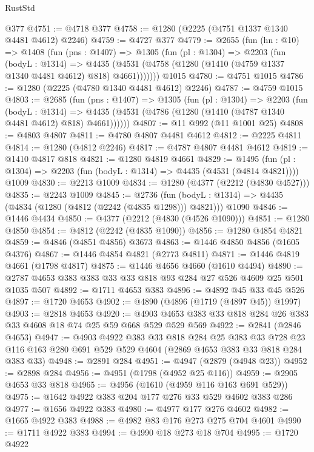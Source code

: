 \begin{lexlean}{RustStd}
\begin{coremodule}
    @377
@4751 := @4718 @377
@4758 := @1280 (@2225 (@4751 @1337 @1340 @4481 @4612) @2246)
@4759 := @4727 @377
@4779 := @2655
    (fun (hn : @10) =>
    @1408
      (fun (pns : @1407) =>
      @1305
        (fun (pl : @1304) =>
        @2203
          (fun (bodyL : @1314) =>
          @4435 (@4531 (@4758 (@1280 (@1410 (@4759 @1337 @1340 @4481 @4612) @818) @4661)))))))
    @1015
@4780 := @4751 @1015
@4786 := @1280 (@2225 (@4780 @1340 @4481 @4612) @2246)
@4787 := @4759 @1015
@4803 := @2685
    (fun (pns : @1407) =>
    @1305
      (fun (pl : @1304) =>
      @2203
        (fun (bodyL : @1314) =>
        @4435 (@4531 (@4786 (@1280 (@1410 (@4787 @1340 @4481 @4612) @818) @4661))))))
@4807 := @11 @992 (@11 @1001 @25)
@4808 := @4803 @4807
@4811 := @4780 @4807 @4481 @4612
@4812 := @2225 @4811
@4814 := @1280 (@4812 @2246)
@4817 := @4787 @4807 @4481 @4612
@4819 := @1410 @4817 @818
@4821 := @1280 @4819 @4661
@4829 := @1495
    (fun (pl : @1304) => @2203 (fun (bodyL : @1314) => @4435 (@4531 (@4814 @4821))))
    @1009
@4830 := @2213 @1009
@4834 := @1280 (@4377 (@2212 (@4830 @4527)))
@4835 := @2243 @1009
@4845 := @2736
    (fun (bodyL : @1314) => @4435 (@4834 (@1280 (@4812 (@2242 (@4835 @1298))) @4821)))
    @1090
@4846 := @1446 @4434
@4850 := @4377 (@2212 (@4830 (@4526 @1090)))
@4851 := @1280 @4850
@4854 := @4812 (@2242 (@4835 @1090))
@4856 := @1280 @4854 @4821
@4859 := @4846 (@4851 @4856) @3673
@4863 := @1446 @4850 @4856 (@1605 @4376)
@4867 := @1446 @4854 @4821 (@2773 @4811)
@4871 := @1446 @4819 @4661 (@1798 @4817)
@4875 := @1446 @4656 @4660 (@1610 @4494)
@4890 := @2787 @4653 @383 @383 @33 @33 @818 @93 @284 @27 @526 @4609 @25 @501 @1035 @507
@4892 := @1711 @4653 @383
@4896 := @4892 @45 @33 @45 @526
@4897 := @1720 @4653
@4902 := @4890 (@4896 (@1719 (@4897 @45)) @1997)
@4903 := @2818 @4653
@4920 := @4903 @4653 @383 @33 @818 @284 @26 @383 @33 @4608 @18 @74 @25 @59 @668 @529 @529 @569
@4922 := @2841 (@2846 @4653)
@4947 := @4903
    @4922
    @383
    @33
    @818
    @284
    @25
    @383
    @33
    @728
    @23
    @116
    @163
    @280
    @691
    @529
    @529
    @4604
    (@2869 @4653 @383 @33 @818 @284 @383 @33)
@4948 := @2891 @284
@4951 := @4947 (@2879 (@4948 @23))
@4952 := @2898 @284
@4956 := @4951 (@1798 (@4952 @25 @116))
@4959 := @2905 @4653 @33 @818
@4965 := @4956 (@1610 (@4959 @116 @163 @691 @529))
@4975 := @1642 @4922 @383 @204 @177 @276 @33 @529 @4602 @383 @286
@4977 := @1656 @4922 @383
@4980 := @4977 @177 @276 @4602
@4982 := @1665 @4922 @383
@4988 := @4982 @83 @176 @273 @275 @704 @4601
@4990 := @1711 @4922 @383
@4994 := @4990 @18 @273 @18 @704
@4995 := @1720 @4922

\end{coremodule}
\end{lexlean}
